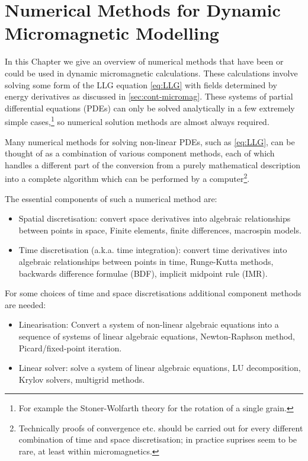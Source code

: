 \chapter{Numerical Methods for Dynamic Micromagnetic Modelling}
\label{sec:numer-meth-micr}

In this Chapter we give an overview of numerical methods that have been or could be used in dynamic micromagnetic calculations.
These calculations involve solving some form of the LLG equation \eqref{eq:LLG} with fields determined by energy derivatives as discussed in \autoref{sec:cont-micromag}.
These systems of partial differential equations (PDEs) can only be solved analytically in a few extremely simple cases,\footnote{For example the Stoner-Wolfarth theory for the rotation of a single grain.\cite{Stoner1948a}}\cite{Aharoni1996} so numerical solution methods are almost always required.

Many numerical methods for solving non-linear PDEs, such as \eqref{eq:LLG}, can be thought of as a combination of various component methods, each of which handles a different part of the conversion from a purely mathematical description into a complete algorithm which can be performed by a computer\footnote{Technically proofs of convergence etc. should be carried out for every different combination of time and space discretisation\cite[382]{Iserles2009}; in practice suprises seem to be rare, at least within micromagnetics.}.

The essential components of such a numerical method are:
\begin{itemize}
\item Spatial discretisation: convert space derivatives into algebraic relationships between points in space, \eg Finite elements, finite differences, macrospin models. 
\item Time discretisation (a.k.a. time integration):  convert time derivatives into algebraic relationships between points in time, \eg Runge-Kutta methods, backwards difference formulae (BDF), implicit midpoint rule (IMR).
\end{itemize}
For some choices of time and space discretisations additional component methods are needed:
\begin{itemize}
\item Linearisation: Convert a system of non-linear algebraic equations into a sequence of systems of linear algebraic equations, \eg Newton-Raphson method, Picard/fixed-point iteration. 
\item Linear solver: solve a system of linear algebraic equations, \eg LU decomposition, Krylov solvers, multigrid methods. 
\end{itemize}

